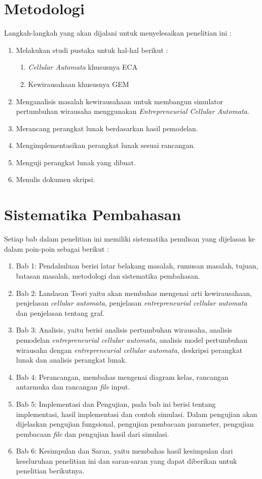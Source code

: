 \section{Metodologi}
\label{sec:metlit}
Langkah-langkah yang akan dijalani untuk menyelesaikan penelitian ini :
\begin{enumerate}
	\item Melakukan studi pustaka untuk hal-hal berikut :
		\begin{enumerate}
			\item \textit{Cellular Automata} khususnya ECA
			\item Kewirausahaan khususnya GEM
		\end{enumerate}
	\item Menganalisis masalah kewirausahaan untuk membangun simulator pertumbuhan wirausaha menggunakan \textit{Entrepreneurial Cellular Automata}.
	\item Merancang perangkat lunak berdasarkan hasil pemodelan.
	\item Mengimplementasikan perangkat lunak sesuai rancangan.
	\item Menguji perangkat lunak yang dibuat.
	\item Menulis dokumen skripsi.
\end{enumerate}


\section{Sistematika Pembahasan}
\label{sec:sispem}
Setiap bab dalam penelitian ini memiliki sistematika penulisan yang dijelasan ke dalam poin-poin sebagai berikut :
\begin{enumerate}
	\item Bab 1: Pendahuluan berisi latar belakang masalah, rumusan masalah, tujuan, batasan masalah, metodologi dan sistematika pembahasan.
	\item Bab 2: Landasan Teori yaitu akan membahas mengenai arti kewirausahaan, penjelasan \textit{cellular automata}, penjelasan \textit{entrepreneurial cellular automata} dan penjelasan tentang graf.
	\item Bab 3: Analisis, yaitu berisi analisis pertumbuhan wirausaha, analisis pemodelan \textit{entrepreneurial cellular automata}, analisis model pertumbuhan wirausaha dengan \textit{entrepreneurial cellular automata}, deskripsi perangkat lunak dan analisis perangkat lunak.
	\item Bab 4: Perancangan, membahas mengenai diagram kelas, rancangan antarmuka dan rancangan \textit{file} input.
	\item Bab 5: Implementasi dan Pengujian, pada bab ini berisi tentang implementasi, hasil implementasi dan contoh simulasi. Dalam pengujian akan dijelaskan pengujian fungsional, pengujian pembacaan parameter, pengujian pembacaan \textit{file} dan pengujian hasil dari simulasi.
	\item Bab 6: Kesimpulan dan Saran, yaitu membahas hasil kesimpulan dari keseluruhan penelitian ini dan saran-saran yang dapat diberikan untuk penelitian berikutnya.
\end{enumerate}



